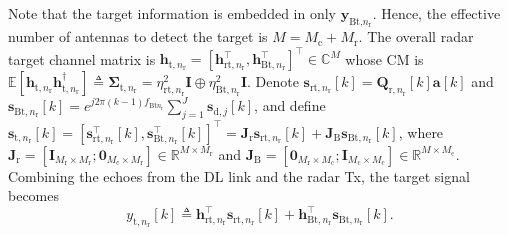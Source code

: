 \documentclass[9pt,journal]{IEEEtran}
\newcommand{\paren}[1]{\left({#1}\right)}
\newcommand{\bracket}[1]{{\left [{#1}\right ]}}
\newcommand{\rr}{_\mathrm{r}}
\newcommand{\cc}{_\mathrm{c}}
\newcommand{\target}{\mathrm{t}}
\newcommand{\MM}{\mathit{M}}
\newcommand{\stnrk}{\mathbf{s}_{\textrm{t},n_{\textrm{r}}}\bracket{k}}
\newcommand{\srtnrk}{\mathbf{s}_{\textrm{rt},n_{\textrm{r}}}\bracket{k}}
\newcommand{\sBtnrk}{\mathbf{s}_{\textrm{Bt},n_{\textrm{r}}}\bracket{k}}
\theoremstyle{definition}
\begin{document}
 Note that the target information is embedded in only  $\mathbf{y}_{\textrm{Bt,}n\rr}$. Hence, the effective number of antennas to detect the target is $\mathit{M}=\mathit{M}\cc+\MM\rr$. The overall radar target channel matrix is $\mathbf{h}_{\target,n\rr}=\bracket{\mathbf{h}^\top_{\textrm{rt},n\rr},\mathbf{h}^\top_{\textrm{Bt},n\rr}}^\top\in\mathbb{C}^{\mathit{M}}$ whose CM is $\mathbb{E}\bracket{\mathbf{h}_{\target,n\rr}\mathbf{h}^\dagger_{\target,n\rr}}\triangleq\boldsymbol{\Sigma}_{\target,n\rr}=\eta^2_{\textrm{rt},n\rr}\mathbf{I}\oplus\eta^2_{\textrm{Bt},n\rr}\mathbf{I}$. Denote $\mathbf{s}_{\mathrm{rt,}n\rr}\bracket{k}=\mathbf{Q}_{\mathrm{r,}n\rr}\bracket{k}\mathbf{a}\bracket{k}$ and $\mathbf{s}_{\mathrm{Bt},n\rr}\bracket{k}=e^{j2\pi\paren{k-1} f_{\mathrm{Bt}n_\mathrm{r}}}
\sum_{j=1}^\mathit{J}\mathbf{s}_{\textrm{d},j}\bracket{k}$, and define $\stnrk=\bracket{\mathbf{s}^\top_{\textrm{rt},n\rr}\bracket{k},\mathbf{s}^\top_{\textrm{Bt},n\rr}\bracket{k}}^\top=\mathbf{J}_{\textrm{r}}\srtnrk+\mathbf{J}_{\textrm{B}}\sBtnrk$, where $\mathbf{J}_{\textrm{r}}=\bracket{\mathbf{I}_{\mathit{M}\rr\times \mathit{M}\rr};\mathbf{0}_{\mathit{M}\cc\times \mathit{M}\rr}}\in\mathbb{R}^{\mathbf{\mathit{M}\times \mathit{M}\rr}}$ and $\mathbf{J}_{\textrm{B}}=\bracket{\mathbf{0}_{\mathit{M}\rr\times \mathit{M}\cc};\mathbf{I}_{\mathit{M}\cc\times \mathit{M}\cc}}\in\mathbb{R}^{\mathbf{\mathit{M}\times \mathit{M}\cc}}$. Combining the echoes from the DL link and the radar Tx, the target signal becomes
\begin{equation}
y_{\target,n\rr}\bracket{k}\triangleq\mathbf{h}^\top_{\textrm{rt},n\rr}\mathbf{s}_{\textrm{rt},n\rr}\bracket{k}+\mathbf{h}^\top_{\textrm{Bt},n\rr}\mathbf{s}_{\textrm{Bt},n\rr}\bracket{k}.    \label{eq:target1}
\end{equation} 
\end{document}
